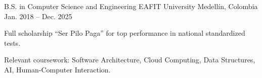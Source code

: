 
\begin{cventries}
  \cventry
    {B.S. in Computer Science and Engineering}
    {EAFIT University}
    {Medellín, Colombia}
    {Jan. 2018 -- Dec. 2025}
    {
      \begin{cvitems}
        \item {Full scholarship “Ser Pilo Paga” for top performance in national standardized tests.}
        \item {Relevant coursework: Software Architecture, Cloud Computing, Data Structures, AI, Human-Computer Interaction.}
      \end{cvitems}
    }
\end{cventries}
